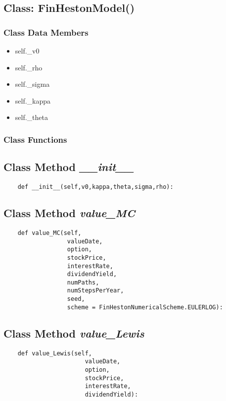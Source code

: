 \documentclass[twoside,11pt]{book}
\begin{document}
\subsection{Class: FinHestonModel()}


\subsubsection{Class Data Members}
\begin{itemize}
\item{self.\_v0}
\item{self.\_rho}
\item{self.\_sigma}
\item{self.\_kappa}
\item{self.\_theta}
\end{itemize}

\subsubsection{Class Functions}

\subsection{Class Method {\it \_\_init\_\_}}


\begin{lstlisting}
    def __init__(self,v0,kappa,theta,sigma,rho):
\end{lstlisting}

\subsection{Class Method {\it value\_MC}}


\begin{lstlisting}
    def value_MC(self,
                  valueDate,
                  option,
                  stockPrice,
                  interestRate,
                  dividendYield,
                  numPaths,
                  numStepsPerYear,
                  seed, 
                  scheme = FinHestonNumericalScheme.EULERLOG):
\end{lstlisting}

\subsection{Class Method {\it value\_Lewis}}


\begin{lstlisting}
    def value_Lewis(self,
                       valueDate,
                       option,
                       stockPrice,
                       interestRate,
                       dividendYield):
\end{lstlisting}
\end{document}

